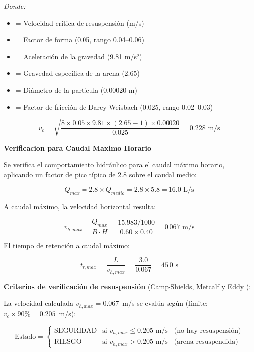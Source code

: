 \documentclass[12pt,a4paper]{article}
\begin{document}
\textit{Donde:}
\begin{itemize}[noitemsep,leftmargin=2em]
    \item[$v_c$] = Velocidad cr\'itica de resuspensi\'on (m/s)
    \item[$\beta$] = Factor de forma (0.05, rango 0.04--0.06)
    \item[$g$] = Aceleraci\'on de la gravedad (9.81 m/s²)
    \item[$S_s$] = Gravedad espec\'ifica de la arena (2.65)
    \item[$d$] = Di\'ametro de la part\'icula (0.00020 m)
    \item[$f$] = Factor de fricci\'on de Darcy-Weisbach (0.025, rango 0.02--0.03)
\end{itemize}

\begin{equation}
v_c = \sqrt{\frac{8 \times 0.05 \times 9.81 \times (2.65 - 1) \times 0.00020}{0.025}} = 0.228 \text{ m/s}
\end{equation}

\textbf{Verificacion para Caudal Maximo Horario}

Se verifica el comportamiento hidr\'aulico para el caudal m\'aximo horario, aplicando un factor de pico t\'ipico de 2.8 sobre el caudal medio:

\begin{equation}
Q_{max} = 2.8 \times Q_{medio} = 2.8 \times 5.8 = 16.0 \text{ L/s}
\end{equation}

A caudal m\'aximo, la velocidad horizontal resulta:

\begin{equation}
v_{h,max} = \frac{Q_{max}}{B \cdot H} = \frac{15.983/1000}{0.60 \times 0.40} = 0.067 \text{ m/s}
\end{equation}

El tiempo de retenci\'on a caudal m\'aximo:

\begin{equation}
t_{r,max} = \frac{L}{v_{h,max}} = \frac{3.0}{0.067} = 45.0 \text{ s}
\end{equation}

\textbf{Criterios de verificaci\'on de resuspensi\'on} (Camp-Shields, Metcalf y Eddy \cite{metcalf2014}):

La velocidad calculada $v_{h,max} = 0.067$~m/s se eval\'ua seg\'un (l\'imite: $v_c \times 90\% = 0.205$~m/s):

\begin{equation}
\text{Estado} = \begin{cases}
    \text{SEGURIDAD} & \text{si } v_{h,max} \leq 0.205 \text{ m/s} \quad \text{(no hay resuspensi\'on)} \\
    \text{RIESGO} & \text{si } v_{h,max} > 0.205 \text{ m/s} \quad \text{(arena resuspendida)}
\end{cases}
\end{equation}
\end{document}

